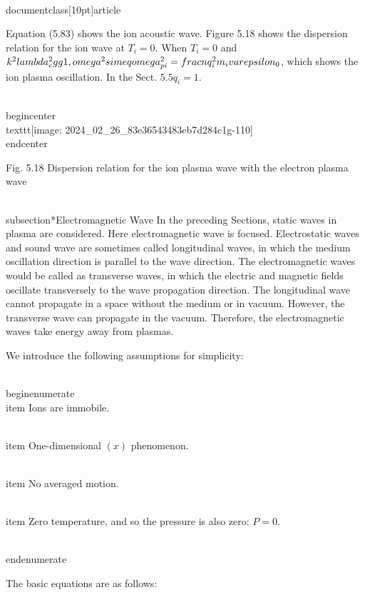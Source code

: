 \\documentclass[10pt]{article}
\begin{document}
{{{{Equation (5.83) shows the ion acoustic wave. Figure 5.18 shows the dispersion relation for the ion wave at $T_{i}=0$. When $T_{i}=0$ and $k^{2} \\lambda_{e}^{2} \\gg 1, \\omega^{2} \\simeq \\omega_{p i}^{2}=\\frac{n q_{i}^{2}}{m_{i} \\varepsilon_{0}}$, which shows the ion plasma oscillation. In the Sect. $5.5 q_{i}=1$.

\\begin{center}
\\texttt{[image: 2024\_02\_26\_83e36543483eb7d284c1g-110]}
\\end{center}

Fig. 5.18 Dispersion relation for the ion plasma wave with the electron plasma wave

\\subsection*{Electromagnetic Wave}
In the preceding Sections, static waves in plasma are considered. Here electromagnetic wave is focused. Electrostatic waves and sound wave are sometimes called longitudinal waves, in which the medium oscillation direction is parallel to the wave direction. The electromagnetic waves would be called as transverse waves, in which the electric and magnetic fields oscillate transversely to the wave propagation direction. The longitudinal wave cannot propagate in a space without the medium or in vacuum. However, the transverse wave can propagate in the vacuum. Therefore, the electromagnetic waves take energy away from plasmas.

We introduce the following assumptions for simplicity:

\\begin{enumerate}
  \\item Ions are immobile.

  \\item One-dimensional $(x)$ phenomenon.

  \\item No averaged motion.

  \\item Zero temperature, and so the pressure is also zero: $P=0$.

\\end{enumerate}

The basic equations are as follows:


}}}}
\end{document}
